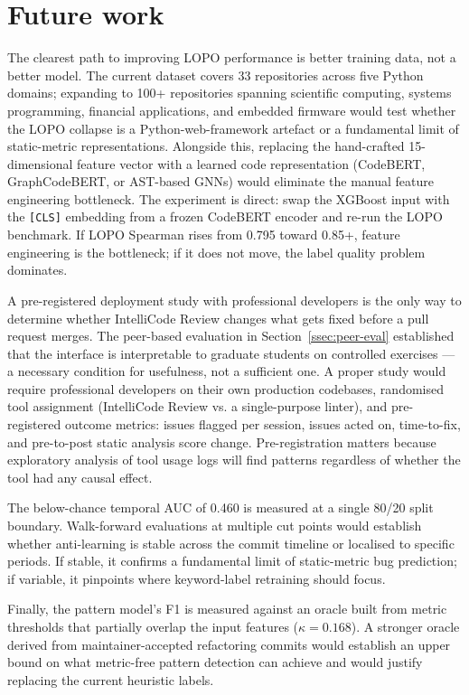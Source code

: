 \documentclass[12pt, oneside]{report}
\begin{document}
\section{Future work}
\label{sec:future}

The clearest path to improving LOPO performance is better training data, not a better model. The current dataset covers 33 repositories across five Python domains; expanding to 100+ repositories spanning scientific computing, systems programming, financial applications, and embedded firmware would test whether the LOPO collapse is a Python-web-framework artefact or a fundamental limit of static-metric representations. Alongside this, replacing the hand-crafted 15-dimensional feature vector with a learned code representation (CodeBERT, GraphCodeBERT, or AST-based GNNs) would eliminate the manual feature engineering bottleneck. The experiment is direct: swap the XGBoost input with the \texttt{[CLS]} embedding from a frozen CodeBERT encoder and re-run the LOPO benchmark. If LOPO Spearman rises from 0.795 toward 0.85+, feature engineering is the bottleneck; if it does not move, the label quality problem dominates.

A pre-registered deployment study with professional developers is the only way to determine whether IntelliCode Review changes what gets fixed before a pull request merges. The peer-based evaluation in Section~\ref{ssec:peer-eval} established that the interface is interpretable to graduate students on controlled exercises — a necessary condition for usefulness, not a sufficient one. A proper study would require professional developers on their own production codebases, randomised tool assignment (IntelliCode Review vs. a single-purpose linter), and pre-registered outcome metrics: issues flagged per session, issues acted on, time-to-fix, and pre-to-post static analysis score change. Pre-registration matters because exploratory analysis of tool usage logs will find patterns regardless of whether the tool had any causal effect.

The below-chance temporal AUC of 0.460 is measured at a single 80/20 split boundary. Walk-forward evaluations at multiple cut points would establish whether anti-learning is stable across the commit timeline or localised to specific periods. If stable, it confirms a fundamental limit of static-metric bug prediction; if variable, it pinpoints where keyword-label retraining should focus.

Finally, the pattern model's F1 is measured against an oracle built from metric thresholds that partially overlap the input features ($\kappa = 0.168$). A stronger oracle derived from maintainer-accepted refactoring commits would establish an upper bound on what metric-free pattern detection can achieve and would justify replacing the current heuristic labels.
\end{document}

